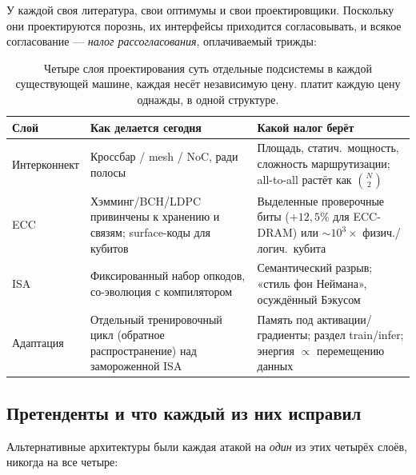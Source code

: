 У каждой своя литература, свои оптимумы и свои проектировщики. Поскольку они
проектируются порознь, их интерфейсы приходится согласовывать, и всякое
согласование --- \emph{налог рассогласования}, оплачиваемый трижды:

\begin{table}[H]
\centering
\small
\caption{Четыре слоя проектирования суть отдельные подсистемы в каждой
существующей машине, каждая несёт независимую цену. \TALOS{} платит каждую
цену однажды, в одной структуре.}
\label{tab:four-layers}
\begin{tabular}{@{}p{2.4cm}p{4.6cm}p{5.2cm}@{}}
\toprule
\textbf{Слой} & \textbf{Как делается сегодня} & \textbf{Какой налог берёт} \\
\midrule
Интерконнект & Кроссбар / mesh / NoC, ради полосы & Площадь, статич.\ мощность, сложность маршрутизации; all-to-all растёт как $\binom{N}{2}$ \\
ECC & Хэмминг/BCH/LDPC привинчены к хранению и связям; surface-коды для кубитов & Выделенные проверочные биты ($+12{,}5\%$ для ECC-DRAM) или $\sim\!10^3\times$ физич./логич.\ кубита \\
ISA & Фиксированный набор опкодов, со-эволюция с компилятором & Семантический разрыв; «стиль фон Неймана», осуждённый Бэкусом \\
Адаптация & Отдельный тренировочный цикл (обратное распространение) над замороженной ISA & Память под активации/градиенты; раздел train/infer; энергия $\propto$ перемещению данных \\
\bottomrule
\end{tabular}
\end{table}

\subsection{Претенденты и что каждый из них исправил}

Альтернативные архитектуры были каждая атакой на \emph{один} из этих четырёх
слоёв, никогда на все четыре:

